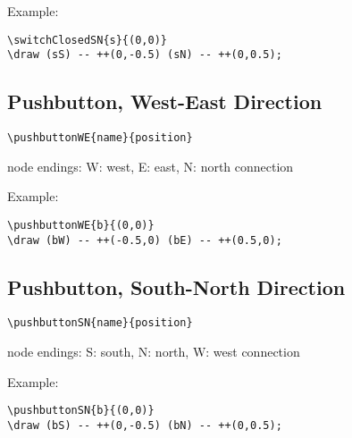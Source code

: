 \documentclass[parskip=full]{scrartcl}
\begin{document}
Example:\\
\begin{minipage}{0.8\textwidth}
\begin{verbatim}
\switchClosedSN{s}{(0,0)}
\draw (sS) -- ++(0,-0.5) (sN) -- ++(0,0.5);
\end{verbatim}
\end{minipage}
\begin{minipage}{0.19\textwidth}
\end{minipage}

\subsection{Pushbutton, West-East Direction}

\begin{verbatim}
\pushbuttonWE{name}{position}
\end{verbatim}
node endings: W: west, E: east, N: north connection

Example:\\
\begin{minipage}{0.8\textwidth}
\begin{verbatim}
\pushbuttonWE{b}{(0,0)}
\draw (bW) -- ++(-0.5,0) (bE) -- ++(0.5,0);
\end{verbatim}
\end{minipage}
\begin{minipage}{0.19\textwidth}
\end{minipage}

\subsection{Pushbutton, South-North Direction}

\begin{verbatim}
\pushbuttonSN{name}{position}
\end{verbatim}
node endings: S: south, N: north, W: west connection

Example:\\
\begin{minipage}{0.8\textwidth}
\begin{verbatim}
\pushbuttonSN{b}{(0,0)}
\draw (bS) -- ++(0,-0.5) (bN) -- ++(0,0.5);
\end{verbatim}
\end{minipage}
\begin{minipage}{0.19\textwidth}
\end{minipage}
\end{document}
